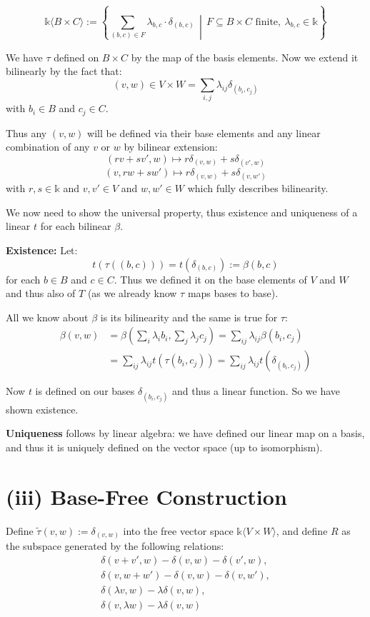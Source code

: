 \documentclass[10pt]{tufte-handout}
\begin{document}
\[
\mathds{k}\langle B \times C \rangle := \left\{ \sum_{(b, c) \in F} \lambda_{b,c} \cdot \delta_{(b, c)} \,\middle|\, F \subseteq B \times C \text{ finite},\ \lambda_{b,c} \in \mathds{k} \right\}
\]

We have $\tau$ defined on $B \times C$ by the map of the basis elements. Now we extend it bilinearly by the fact that:
\[
   (v,w) \in V \times W = \sum_{i,j} \lambda_{ij} \delta_{(b_i, c_j)}
\]
with $b_i \in B$ and $c_j \in C$.

Thus any $(v,w)$ will be defined via their base elements and any linear combination of any $v$ or $w$ by bilinear extension:
\[
   (rv+sv', w) \mapsto r \delta_{(v,w)} + s \delta_{(v',w)}
\]
\[
   (v, rw+sw') \mapsto r \delta_{(v,w)} + s \delta_{(v,w')}
\]
with $r,s \in \mathds{k}$ and $v,v' \in V$ and $w, w' \in W$ which fully describes bilinearity.

We now need to show the universal property, thus existence and uniqueness of a linear $t$ for each bilinear $\beta$.

\textbf{Existence:}
Let:
\[
    t(\tau((b,c)))=t(\delta_{(b,c)}) := \beta(b,c)
\]
for each $b \in B$ and $c \in C$. Thus we defined it on the base elements of $V$ and $W$ and thus also of $T$ (as we already know $\tau$ maps bases to base).

All we know about $\beta$ is its bilinearity and the same is true for $\tau$:
\begin{align*}
\beta(v, w) &= \beta\left( \sum_i \lambda_i b_i, \sum_j \lambda_j c_j \right) = \sum_{ij} \lambda_{ij} \beta(b_i, c_j) \\
&= \sum_{ij} \lambda_{ij} t(\tau(b_i, c_j)) = \sum_{ij} \lambda_{ij} t(\delta_{(b_i, c_j)})
\end{align*}

Now $t$ is defined on our bases $\delta_{(b_i, c_j)}$ and thus a linear function.
So we have shown existence.

\textbf{Uniqueness} follows by linear algebra: we have defined our linear map on a basis, and thus it is uniquely defined on the vector space (up to isomorphism).

\section{(iii) Base-Free Construction}

Define $\widetilde{\tau}(v, w) := \delta_{(v,w)}$ into the free vector space $\mathds{k}\langle V \times W \rangle$, and define $R$ as the subspace generated by the following relations:
\begin{align*}
\delta(v + v', w) - \delta(v, w) - \delta(v', w), \\
\delta(v, w + w') - \delta(v, w) - \delta(v, w'), \\
\delta(\lambda v, w) - \lambda\delta(v, w), \\
\delta(v, \lambda w) - \lambda\delta(v, w)
\end{align*}
\end{document}

